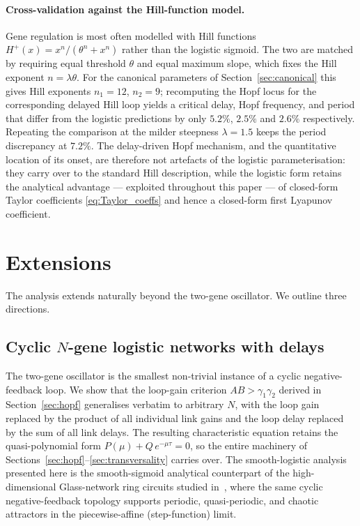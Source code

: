 \documentclass[sn-mathphys,Numbered]{sn-jnl}
\theoremstyle{thmstyleone}
\theoremstyle{thmstyletwo}
\theoremstyle{thmstylethree}
\begin{document}
\paragraph{Cross-validation against the Hill-function model.}
Gene regulation is most often modelled with Hill functions
$H^{+}(x)=x^{n}/(\theta^{n}+x^{n})$ rather than the logistic sigmoid.
The two are matched by requiring equal threshold $\theta$ and equal
maximum slope, which fixes the Hill exponent $n=\lambda\theta$. For the
canonical parameters of Section~\ref{sec:canonical} this gives Hill
exponents $n_1=12$, $n_2=9$; recomputing the Hopf locus for the
corresponding delayed Hill loop yields a critical delay, Hopf frequency,
and period that differ from the logistic predictions by only
$5.2\%$, $2.5\%$ and $2.6\%$ respectively. Repeating the comparison at
the milder steepness $\lambda=1.5$ keeps the period discrepancy at
$7.2\%$. The delay-driven Hopf mechanism, and the quantitative location
of its onset, are therefore not artefacts of the logistic
parameterisation: they carry over to the standard Hill description,
while the logistic form retains the analytical advantage --- exploited
throughout this paper --- of closed-form Taylor coefficients
\eqref{eq:Taylor_coeffs} and hence a closed-form first Lyapunov
coefficient.

\section{Extensions}
\label{sec:extensions}

The analysis extends naturally beyond the two-gene oscillator. We outline
three directions.

\subsection{Cyclic $N$-gene logistic networks with delays}
\label{sec:n_gene}

The two-gene oscillator is the smallest non-trivial instance of a
cyclic negative-feedback loop. We show that the loop-gain criterion
$AB>\gamma_1\gamma_2$ derived in Section~\ref{sec:hopf} generalises
verbatim to arbitrary $N$, with the loop gain replaced by the product
of all individual link gains and the loop delay replaced by the sum
of all link delays. The resulting characteristic equation retains the
quasi-polynomial form $P(\mu)+Q\,e^{-\mu\tau}=0$, so the entire
machinery of Sections~\ref{sec:hopf}--\ref{sec:transversality} carries
over. The smooth-logistic analysis presented here is the smooth-sigmoid
analytical counterpart of the high-dimensional Glass-network ring
circuits studied
in~\cite{belgacem2025computer,farcot2019chaos}, where the same cyclic
negative-feedback topology supports periodic, quasi-periodic, and
chaotic attractors in the piecewise-affine (step-function) limit.
\end{document}
